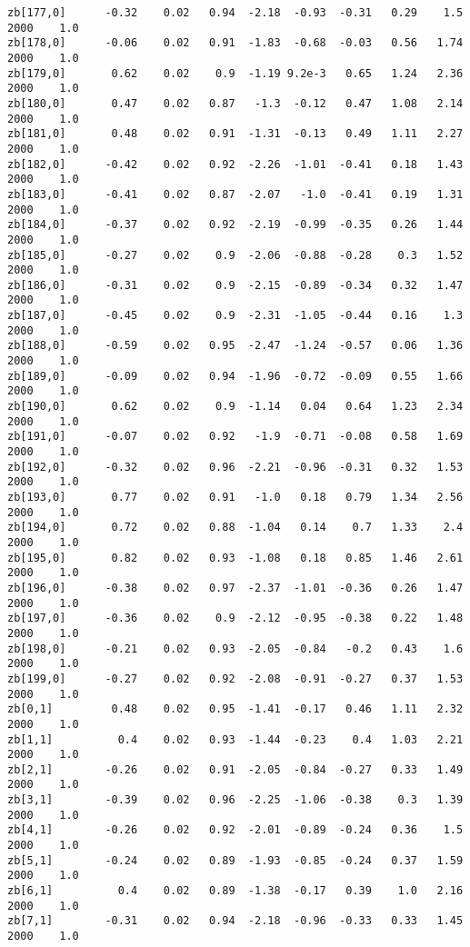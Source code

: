 \documentclass[11pt]{article}
\begin{document}
\begin{Verbatim}[commandchars=\\\{\}]
zb[177,0]      -0.32    0.02   0.94  -2.18  -0.93  -0.31   0.29    1.5   2000    1.0
zb[178,0]      -0.06    0.02   0.91  -1.83  -0.68  -0.03   0.56   1.74   2000    1.0
zb[179,0]       0.62    0.02    0.9  -1.19 9.2e-3   0.65   1.24   2.36   2000    1.0
zb[180,0]       0.47    0.02   0.87   -1.3  -0.12   0.47   1.08   2.14   2000    1.0
zb[181,0]       0.48    0.02   0.91  -1.31  -0.13   0.49   1.11   2.27   2000    1.0
zb[182,0]      -0.42    0.02   0.92  -2.26  -1.01  -0.41   0.18   1.43   2000    1.0
zb[183,0]      -0.41    0.02   0.87  -2.07   -1.0  -0.41   0.19   1.31   2000    1.0
zb[184,0]      -0.37    0.02   0.92  -2.19  -0.99  -0.35   0.26   1.44   2000    1.0
zb[185,0]      -0.27    0.02    0.9  -2.06  -0.88  -0.28    0.3   1.52   2000    1.0
zb[186,0]      -0.31    0.02    0.9  -2.15  -0.89  -0.34   0.32   1.47   2000    1.0
zb[187,0]      -0.45    0.02    0.9  -2.31  -1.05  -0.44   0.16    1.3   2000    1.0
zb[188,0]      -0.59    0.02   0.95  -2.47  -1.24  -0.57   0.06   1.36   2000    1.0
zb[189,0]      -0.09    0.02   0.94  -1.96  -0.72  -0.09   0.55   1.66   2000    1.0
zb[190,0]       0.62    0.02    0.9  -1.14   0.04   0.64   1.23   2.34   2000    1.0
zb[191,0]      -0.07    0.02   0.92   -1.9  -0.71  -0.08   0.58   1.69   2000    1.0
zb[192,0]      -0.32    0.02   0.96  -2.21  -0.96  -0.31   0.32   1.53   2000    1.0
zb[193,0]       0.77    0.02   0.91   -1.0   0.18   0.79   1.34   2.56   2000    1.0
zb[194,0]       0.72    0.02   0.88  -1.04   0.14    0.7   1.33    2.4   2000    1.0
zb[195,0]       0.82    0.02   0.93  -1.08   0.18   0.85   1.46   2.61   2000    1.0
zb[196,0]      -0.38    0.02   0.97  -2.37  -1.01  -0.36   0.26   1.47   2000    1.0
zb[197,0]      -0.36    0.02    0.9  -2.12  -0.95  -0.38   0.22   1.48   2000    1.0
zb[198,0]      -0.21    0.02   0.93  -2.05  -0.84   -0.2   0.43    1.6   2000    1.0
zb[199,0]      -0.27    0.02   0.92  -2.08  -0.91  -0.27   0.37   1.53   2000    1.0
zb[0,1]         0.48    0.02   0.95  -1.41  -0.17   0.46   1.11   2.32   2000    1.0
zb[1,1]          0.4    0.02   0.93  -1.44  -0.23    0.4   1.03   2.21   2000    1.0
zb[2,1]        -0.26    0.02   0.91  -2.05  -0.84  -0.27   0.33   1.49   2000    1.0
zb[3,1]        -0.39    0.02   0.96  -2.25  -1.06  -0.38    0.3   1.39   2000    1.0
zb[4,1]        -0.26    0.02   0.92  -2.01  -0.89  -0.24   0.36    1.5   2000    1.0
zb[5,1]        -0.24    0.02   0.89  -1.93  -0.85  -0.24   0.37   1.59   2000    1.0
zb[6,1]          0.4    0.02   0.89  -1.38  -0.17   0.39    1.0   2.16   2000    1.0
zb[7,1]        -0.31    0.02   0.94  -2.18  -0.96  -0.33   0.33   1.45   2000    1.0

\end{Verbatim}
\end{document}
